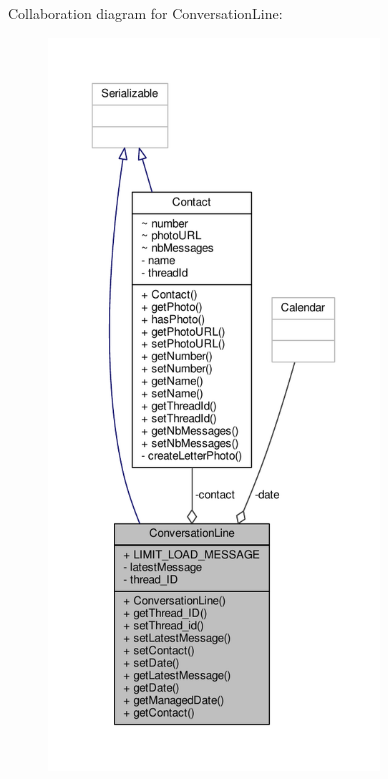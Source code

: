 Collaboration diagram for Conversation\+Line\+:
\nopagebreak
\begin{figure}[H]
\begin{center}
\leavevmode
\includegraphics[height=550pt]{a00065}
\end{center}
\end{figure}
